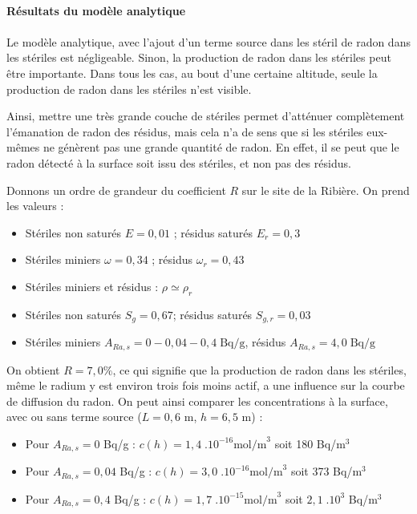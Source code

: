 \documentclass{article}
\begin{document}
\paragraph{Résultats du modèle analytique}

\paragraph{} Le modèle analytique, avec l'ajout d'un terme source dans les stéril de radon dans les stériles est négligeable. Sinon, la production de radon dans les stériles peut être importante. Dans tous les cas, au bout d'une certaine altitude, seule la production de radon dans les stériles n'est visible.

Ainsi, mettre une très grande couche de stériles permet d'atténuer complètement l'émanation de radon des résidus, mais cela n'a de sens que si les stériles eux-mêmes ne génèrent pas une grande quantité de radon. En effet, il se peut que le radon détecté à la surface soit issu des stériles, et non pas des résidus.

Donnons un ordre de grandeur du coefficient $R$ sur le site de la Ribière. On prend les valeurs :
\begin{itemize}
  \item Stériles non saturés $E=0,01$ ; résidus saturés $E_r=0,3$ 
  \item Stériles miniers $\omega = 0,34$ ; résidus $\omega_r = 0,43 $
  \item Stériles miniers et résidus : $\rho \simeq \rho_r$
  \item Stériles non saturés $S_g = 0,67$; résidus saturés $S_{g,r}=0,03$
  \item Stériles miniers $A_{Ra,s}= 0 - 0,04 - 0,4 \; \text{Bq/g}$, résidus $A_{Ra,s}= 4,0 \; \text{Bq/g}$
\end{itemize}
On obtient $ R=7,0\%$, ce qui signifie que la production de radon dans les stériles, même le radium y est environ trois fois moins actif, a une influence sur la courbe de diffusion du radon. On peut ainsi comparer les concentrations à la surface, avec ou sans terme source ($L=0,6$ m, $h=6,5$ m) :
\begin{itemize}
  \item Pour $A_{Ra,s}=0$ Bq/g : $c(h) = 1,4 \; .10^{-16} \text{mol/m}^3$ soit 180 Bq/m$^3$
  \item Pour $A_{Ra,s}=0,04$ Bq/g : $c(h) = 3,0 \; .10^{-16} \text{mol/m}^3$ soit 373 Bq/m$^3$
  \item Pour $A_{Ra,s}=0,4$ Bq/g : $c(h) = 1,7 \; .10^{-15} \text{mol/m}^3$ soit $2,1 \; .10^3$ Bq/m$^3$
\end{itemize}
\end{document}
